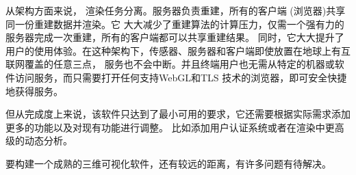 从架构方面来说，
渲染任务分离。服务器负责重建，所有的客户端 (浏览器)共享同一份重建数据并渲染。它
大大减少了重建算法的计算压力，仅需一个强有力的服务器完成一次重建，所有的客户端都可以共享重建结果。 
同时，它大大提升了用户的使用体验。在这种架构下，传感器、服务器和客户端即使放置在地球上有互联网覆盖的任意三点，
服务也不会中断。并且终端用户也无需从特定的机器或软件访问服务，而只需要打开任何支持WebGL和TLS
技术的浏览器，即可安全快捷地获得服务。

但从完成度上来说，该软件只达到了最小可用的要求，它还需要根据实际需求添加更多的功能以及对现有功能进行调整。
比如添加用户认证系统或者在渲染中更高级的动态分析。

要构建一个成熟的三维可视化软件，还有较远的距离，有许多问题有待解决。
